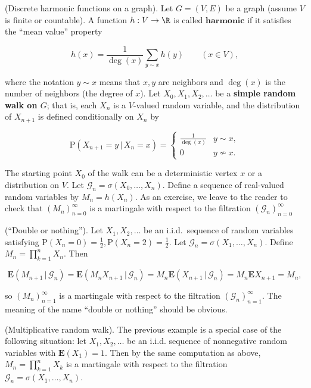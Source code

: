 \begin{example}
(Discrete harmonic functions on a graph). Let
$G=(V,E)$ be a graph (assume $V$ is finite or
countable). A function $h:V\to\R$ is called
$\textbf{harmonic}$ if it satisfies the ``mean
value'' property

\[
h(x) = \frac{1}{\operatorname{deg}(x)}\sum_{y \sim x} h(y) \qquad (x\in V),
\]

\noindent where the notation $y\sim x$ means that $x,y$ are
neighbors and $\operatorname{deg}(x)$ is the number
of neighbors (the degree of $x$). Let
$X_0,X_1,X_2,\ldots$ be a \textbf{simple random walk on $G$};
that is, each $X_n$ is a $V$-valued random variable,
and the distribution of $X_{n+1}$ is defined
conditionally on $X_n$ by

\[
\mathrm{P}(X_{n+1} = y\,|\,X_n=x) = \begin{cases} \frac{1}{\operatorname{deg}(x)} & y\sim x, \\ 0 & y\nsim x.
\end{cases}
\]

\noindent The starting point $X_0$ of the walk can be a
deterministic vertex $x$ or a distribution on $V$.
Let $\mathcal{G}_n=\sigma(X_0,\ldots,X_n)$. Define a
sequence of real-valued random variables by
$M_n = h(X_n)$. As an exercise, we leave to the
reader to check that $(M_n)_{n=0}^\infty$ is a
martingale with respect to the filtration
$(\mathcal{G}_n)_{n=0}^\infty$
\end{example}

\begin{example}
(``Double or nothing''). Let $X_1,X_2,\ldots$ be an
i.i.d.\ sequence of random variables satisfying
$\mathrm{P}(X_n = 0) = \tfrac12, \mathrm{P}(X_n = 2)
= \tfrac12$.
Let $\mathcal{G}_n=\sigma(X_1,\ldots,X_n)$. Define
$M_n = \prod_{k=1}^n X_n$. Then

\[
\mathbf{E}\left(M_{n+1}\,|\,\mathcal{G}_{n}\right) = \mathbf{E}\left(M_{n} X_{n+1}\,|\,\mathcal{G}_n\right) = M_{n} \mathbf{E}\left(X_{n+1}\,|\,\mathcal{G}_n\right) = M_{n} \mathbf{E}{X_{n+1}} = M_n,
\]

\noindent so $(M_n)_{n=1}^\infty$ is a martingale with respect
to the filtration $(\mathcal{G}_n)_{n=1}^\infty$. The
meaning of the name ``double or nothing'' should be
obvious.
\end{example}

\begin{example}
(Multiplicative random walk). The previous example is
a special case of the following situation: let
$X_1, X_2, \ldots$ be an i.i.d. sequence of
nonnegative random variables with $\mathbf{E}(X_1)=1$.
Then by the same computation as above,
$M_n = \prod_{k=1}^n X_k$ is a martingale with
respect to the filtration
$\mathcal{G}_n = \sigma(X_1,\ldots,X_n)$.
\end{example}


